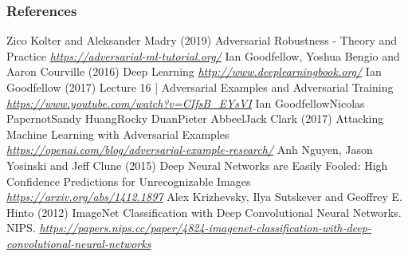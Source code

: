 \begin{vbframe}
\frametitle{References}
\footnotesize{
\begin{thebibliography}{99}
 Zico Kolter and Aleksander Madry (2019)
\newblock Adversarial Robustness - Theory and Practice
\newblock \emph{\url{https://adversarial-ml-tutorial.org/}}
 Ian Goodfellow, Yoshua Bengio and Aaron Courville (2016)
\newblock Deep Learning
\newblock \emph{\url{http://www.deeplearningbook.org/}}
 Ian Goodfellow (2017)
\newblock Lecture 16 | Adversarial Examples and Adversarial Training
\newblock \emph{\url{https://www.youtube.com/watch?v=CIfsB_EYsVI}}
  Ian GoodfellowNicolas PapernotSandy HuangRocky DuanPieter AbbeelJack Clark (2017)
\newblock Attacking Machine Learning with Adversarial Examples
\newblock \emph{\url{https://openai.com/blog/adversarial-example-research/}}
 Anh Nguyen, Jason Yosinski and Jeff Clune (2015)
\newblock Deep Neural Networks are Easily Fooled: High Confidence Predictions for Unrecognizable Images
\newblock \emph{\url{https://arxiv.org/abs/1412.1897}}
 Alex Krizhevsky, Ilya Sutskever and Geoffrey E. Hinto (2012)
\newblock ImageNet Classification with Deep Convolutional Neural Networks. NIPS. 
\newblock \emph{\url{https://papers.nips.cc/paper/4824-imagenet-classification-with-deep-convolutional-neural-networks}}

\end{thebibliography}}
\end{vbframe}
